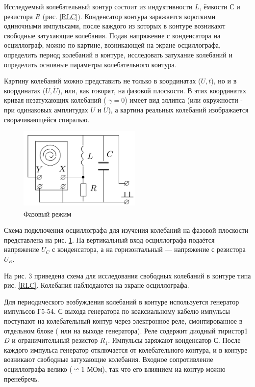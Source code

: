 \documentclass[a4paper, 14pt]{extarticle}
\begin{document}
Исследуемый колебательный контур состоит из индуктивности $ L $,
ёмкости $ С $ и резистора $ R $ (рис. \ref{RLC}). Конденсатор контура заряжается
короткими одиночными импульсами, после каждого из которых в контуре
возникают свободные затухающие колебания. Подав напряжение
с конденсатора на осциллограф, можно по картине, возникающей на
экране осциллографа, определить период колебаний в контуре, исследовать
затухание колебаний и определить основные параметры колебательного
контура.

Картину колебаний можно представить не только в координатах ($ U, t $), но и в координатах ($ U, \dot{U} $), или, как говорят, на фазовой
плоскости. В этих координатах кривая незатухающих колебаний ( $ \gamma = 0 $)
имеет вид эллипса (или окружности - при одинаковых амплитудах $ U $
и $ \dot{U} $), а картина реальных колебаний изображается сворачивающейся
спиралью. 


\begin{figure}[h]
	\includegraphics[width=6cm]{pics/Fase.png}
	\caption{Фазовый режим}
	\label{Fase}
\end{figure}

Схема подключения осциллографа для изучения колебаний на фазовой плоскости представлена на рис. \ref{Fase}. На вертикальный вход осциллографа подаётся напряжение $ U_C $ с конденсатора, а на горизонтальный --- напряжение с резистора $ U_R $.

На рис. 3 приведена схема для исследования свободных колебаний в контуре типа рис. \ref{RLC}. Колебания наблюдаются на экране осциллографа.

Для периодического возбуждения колебаний в контуре используется
генератор импульсов Г5-54. С выхода генератора по коаксиальному кабелю импульсы поступают на колебательный контур через электронное
реле, смонтированное в отдельном блоке ( или на выходе генератора).
Реле содержит диодный тиристор1 $ D $ и ограничительный резистор $ R_1 $.
Импульсы заряжают конденсатор $ С $. После каждого импульса генератор
отключается от колебательного контура, и в контуре возникают
свободные затухающие колебания. Входное сопротивление осциллографа
велико ($ \backsimeq 1$ МОм), так что его влиянием иа контур можно пренебречь.
\end{document}
